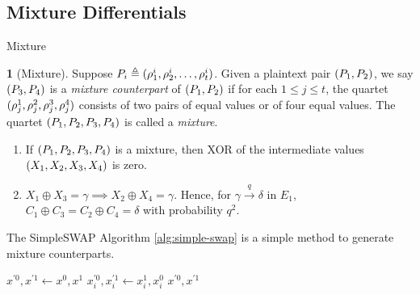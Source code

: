 \documentclass[notheorems]{beamer}
\theoremstyle{definition}
\newtheorem{definition}{\translate{Definition}}
\theoremstyle{example}
\begin{document}
    \subsection{Mixture Differentials}
    \label{subsec:mixture}
    
    \begin{frame}{Mixture}
        \begin{definition}[Mixture]
            \label{def:mixture}
            Suppose \(P_i \triangleq (\rho_1^i, \rho_2^i, \ldots,
            \rho_t^i)\). Given a plaintext pair \((P_1, P_2)\), we say
            \((P_3, P_4)\) is a \emph{mixture counterpart} of \((P_1,
            P_2)\) if for each \(1 \le j \le t\), the quartet \((\rho_j^1,
            \rho_j^2, \rho_j^3, \rho_j^4)\) consists of two pairs of equal
            values or of four equal values. The quartet \((P_1, P_2, P_3,
            P_4)\) is called a \emph{mixture}.
        \end{definition}
        \pause
        \begin{enumerate}
            \item<2-> If \((P_1, P_2, P_3, P_4)\) is a mixture, then XOR of
            the intermediate values \((X_1, X_2, X_3, X_4)\) is zero.
            \item<3-> \(X_1 \oplus X_3 = \gamma \implies X_2 \oplus X_4 =
            \gamma\). Hence, for \(\gamma \xrightarrow{q} \delta\) in \(E_1\),
            \(C_1 \oplus C_3 = C_2 \oplus C_4 = \delta\) with probability
            \(q^2\).
        \end{enumerate}
    \end{frame}

    \begin{frame}{The SimpleSWAP Algorithm}
        \cref{alg:simple-swap} is a simple method to generate mixture
        counterparts.
        \begin{algorithm}[H]
            \caption{Swaps the first word where texts are different and returns one word.}
            \label{alg:simple-swap}
            \begin{algorithmic}[1]
                 
                    \State \(x^{\prime 0}, x^{\prime 1} \gets x^0, x^1\)
                            \State \(x_i^{\prime 0}, x_i^{\prime 1} \gets x_i^1, x_i^0\)
                            \State \Return \(x^{\prime 0}, x^{\prime 1}\)
                        \EndIf
                    \EndFor
                \EndFunction
            \end{algorithmic}
        \end{algorithm}
    \end{frame}
\end{document}
